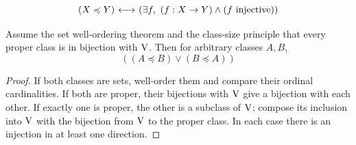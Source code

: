 \begin{definition} %
\[
(X \preccurlyeq Y)
{\ \longleftrightarrow\ }
(\exists f,\ (f:X\to Y)\land (f \mathrm{\ injective}))
\]
\end{definition}

\begin{theorem}
Assume the set well-ordering theorem and the class-size principle that
every proper class is in bijection with $\mathrm{V}$. Then for arbitrary classes
$A,B$,
\[
((A\preccurlyeq B)\lor(B\preccurlyeq A))
\]
\end{theorem}
\begin{proof}
If both classes are sets, well-order them and compare their ordinal
cardinalities. If both are proper, their bijections with $\mathrm{V}$ give a
bijection with each other. If exactly one is proper, the other is a
subclass of $\mathrm{V}$; compose its inclusion into $\mathrm{V}$ with the bijection
from $\mathrm{V}$ to the proper class. In each case there is an injection in
at least one direction.
\end{proof}
\iffalse
\begin{definition}[$X$ is smaller than or equal to $Y$ in cardinality]
\[
(X\prec Y)
\iff
(
(X\prec Y)
\lor

(\neg(Y \sqsubseteq X))
)
\]
\end{definition}
\fi

